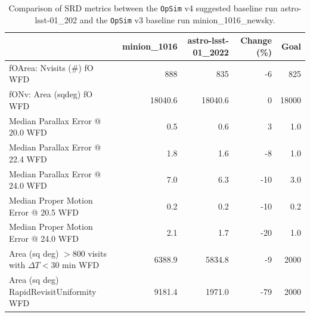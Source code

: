 \documentclass[DM,authoryear,toc]{lsstdoc}
\newcommand{\opsim}{\texttt{OpSim}\xspace}
\begin{document}
\begin{table}
\caption{Comparison of SRD metrics between the \opsim v4 suggested baseline run \break astro-lsst-01\_202 and the \opsim v3 baseline run minion\_1016\_newsky.}
\small
\begin{tabular}{lrrrr}
\toprule
{} &  minion\_1016 &  astro-lsst-01\_2022 &  Change (\%) &  Goal \\
\midrule
fOArea: Nvisits (\#) fO WFD            &                 888 &                 835 &         -6 &   825 \\
fONv: Area (sqdeg) fO WFD             &             18040.6 &             18040.6 &          0 & 18000 \\
Median Parallax Error @ 20.0 WFD      &                 0.5 &                 0.6 &          3 &   1.0 \\
Median Parallax Error @ 22.4 WFD      &                 1.8 &                 1.6 &         -8 &   1.0 \\
Median Parallax Error @ 24.0 WFD      &                 7.0 &                 6.3 &        -10 &   3.0 \\
Median Proper Motion Error @ 20.5 WFD  &                 0.2 &                 0.2 &        -10 &   0.2 \\
Median Proper Motion Error @ 24.0 WFD  &                 2.1 &                 1.7 &        -20 &   1.0 \\
Area (sq deg) $>800$ visits with $\Delta T< 30$ min WFD &              6388.9 &              5834.8 &         -9 &  2000 \\
Area (sq deg) RapidRevisitUniformity WFD &              9181.4 &              1971.0 &        -79 &  2000 \\
\bottomrule
\end{tabular}
\label{tab:srd-comparison}
\end{table}
\end{document}

